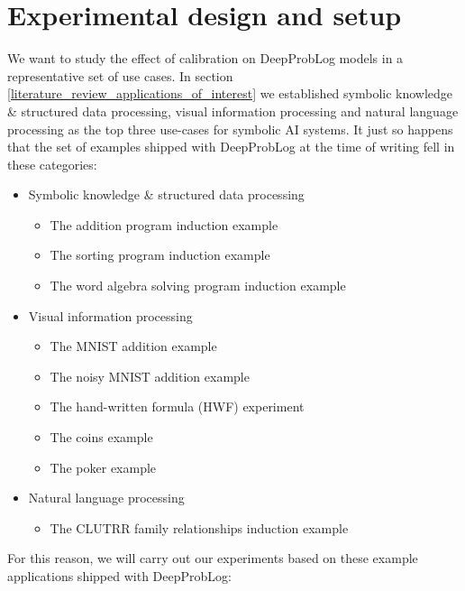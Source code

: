 \section{Experimental design and setup}
We want to study the effect of calibration on DeepProbLog models in a representative set of use cases. In section \ref{literature_review_applications_of_interest} we established symbolic knowledge \& structured data processing, visual information processing and natural language processing as the top three use-cases for symbolic AI systems. It just so happens that the set of examples shipped with DeepProbLog at the time of writing fell in these categories:
\begin{itemize}
  \item Symbolic knowledge \& structured data processing
    \begin{itemize}
      \item The addition program induction example
      \item The sorting program induction example
      \item The word algebra solving program induction example
    \end{itemize}
  \item Visual information processing
    \begin{itemize}
      \item The MNIST addition example
      \item The noisy MNIST addition example
      \item The hand-written formula (HWF) experiment
      \item The coins example
      \item The poker example
    \end{itemize}
  \item Natural language processing
    \begin{itemize}
      \item The CLUTRR family relationships induction example
    \end{itemize}
\end{itemize}
For this reason, we will carry out our experiments based on these example applications shipped with DeepProbLog:
